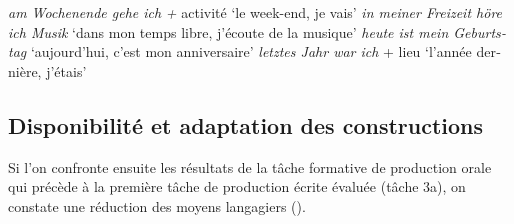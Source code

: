 \documentclass[output=paper]{langscibook}
\begin{document}
\begin{otherlanguage}{french}
\ea%
    \label{ex:felce:7}
    \ea \textit{am Wochenende gehe ich} \textit{+} activité `le week-end, je vais'
    \ex \textit{in meiner Freizeit höre ich Musik} `dans mon temps libre, j’écoute de la musique'
    \ex \textit{heute ist mein Geburtstag} `aujourd’hui, c’est mon anniversaire'
    \ex \textit{letztes Jahr war ich} + lieu `l’année dernière, j’étais'
\z
\z

\subsection{Disponibilité et adaptation des constructions}\label{sec:felce:6.3}
\begin{sloppypar}
Si l’on confronte ensuite les résultats de la tâche formative de production orale qui précède à la première tâche de production écrite évaluée (tâche 3a), on constate une réduction des moyens langagiers ().
\end{sloppypar}


\end{otherlanguage}
\end{document}
